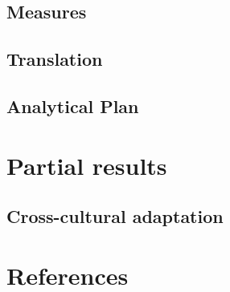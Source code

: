 \documentclass[
  ,doc,11pt, twoside,floatsintext]{apa6}
\begin{document}
\hypertarget{measures}{%
\subsection{Measures}\label{measures}}

\hypertarget{translation}{%
\subsection{Translation}\label{translation}}

\hypertarget{analytical-plan}{%
\subsection{Analytical Plan}\label{analytical-plan}}

\newpage

\hypertarget{partial-results}{%
\section{Partial results}\label{partial-results}}

\hypertarget{cross-cultural-adaptation}{%
\subsection{Cross-cultural adaptation}\label{cross-cultural-adaptation}}

\newpage

\hypertarget{references}{%
\section{References}\label{references}}

\setlength{\parindent}{-0.5in}
\setlength{\leftskip}{0.5in}
\end{document}
